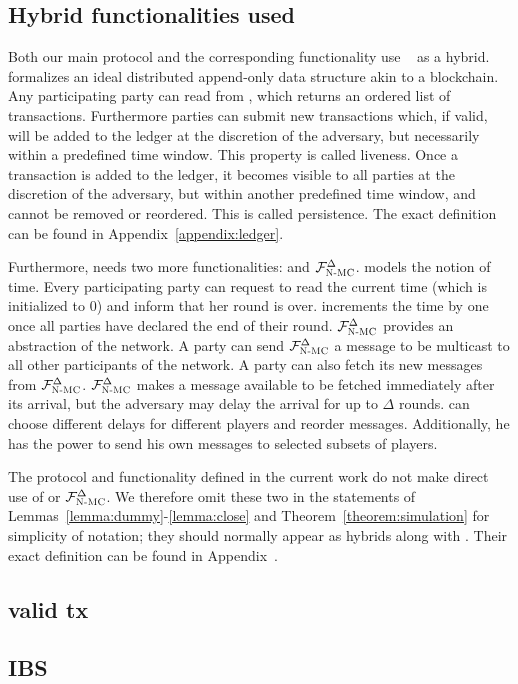   \subsection{Hybrid functionalities used}
    Both our main protocol and the corresponding functionality use
    \ledger~\cite{BMTZ17,genesis} as a hybrid. \ledger{} formalizes an ideal
    distributed append-only data structure akin to a blockchain. Any
    participating party can read from \ledger, which returns an ordered list
    of transactions. Furthermore parties can submit new transactions which, if
    valid, will be added to the ledger at the discretion of the adversary, but
    necessarily within a predefined time window. This property is called
    liveness. Once a transaction is added to the ledger, it becomes visible to
    all parties at the discretion of the adversary, but within another
    predefined time window, and cannot be removed or reordered. This is called
    persistence. The exact definition can be found in
    Appendix~\ref{appendix:ledger}.

    Furthermore, \ledger{} needs two more functionalities: \Fclock and
    $\mathcal{F}_{\textsc{N-MC}}^\Delta$. \Fclock models the notion of time. Every participating
    party can request to read the current time (which is initialized to 0) and
    inform \Fclock that her round is over. \Fclock increments the time by one
    once all parties have declared the end of their round. $\mathcal{F}_{\textsc{N-MC}}^\Delta$
    provides an abstraction of the network. A party can send
    $\mathcal{F}_{\textsc{N-MC}}^\Delta$ a message to be multicast to all other participants of
    the network. A party can also fetch its new messages from
    $\mathcal{F}_{\textsc{N-MC}}^\Delta$. $\mathcal{F}_{\textsc{N-MC}}^\Delta$ makes a message available to be
    fetched immediately after its arrival, but the adversary may delay the
    arrival for up to $\Delta$ rounds. \adversary{} can choose different delays
    for different players and reorder messages. Additionally, he has the power
    to send his own messages to selected subsets of players.

    The protocol and functionality defined in the current work do not make
    direct use of \Fclock or $\mathcal{F}_{\textsc{N-MC}}^\Delta$. We therefore omit these two
    in the statements of Lemmas~\ref{lemma:dummy}-\ref{lemma:close} and
    Theorem~\ref{theorem:simulation} for simplicity of notation; they should
    normally appear as hybrids along with \ledger. Their exact definition can be
    found in Appendix~.

  \subsection{valid tx}
  \subsection{IBS}
